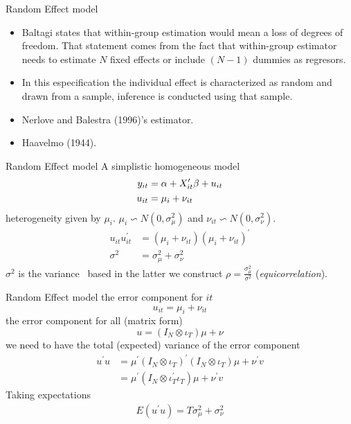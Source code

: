 \begin{frame}{Random Effect model}
	\begin{itemize}
		\item Baltagi states that within-group estimation would mean a loss of degrees of freedom. That statement comes from the fact that within-group estimator needs to estimate $N$ fixed effects or include $(N-1)$ dummies as regresors. \pause
		\item In this especification the individual effect is characterized as random and drawn from a sample, inference is conducted using that sample. \pause
		\item Nerlove and Balestra (1996)'s estimator. \pause
		\item Haavelmo (1944).
	\end{itemize}
\end{frame}
\begin{frame}{Random Effect model}
	A simplistic homogeneous model
		\begin{align}
			y_{it} & = \alpha +X_{it}^{\prime }\beta +u_{it} \\
			u_{it} & = \mu _{i}+\nu _{it}  \notag
		\end{align}
	heterogeneity given by $\mu _{i}.$ $\mu _{i}\backsim N\left( 0,\sigma _{\mu
	}^{2}\right) $ and $\nu _{it}\backsim N\left( 0,\sigma _{\nu }^{2}\right) .$
		\begin{align*}
			u_{it}u_{it}^{\prime } & = \left( \mu _{i}+\nu _{it}\right) \left( \mu
										_{i}+\nu _{it}\right) ^{\prime } \\
			\sigma ^{2} & = \sigma _{\mu }^{2}+\sigma _{\nu }^{2}
		\end{align*}%
	$\sigma ^{2}$ is the variance \ based in the latter we construct $\rho = \frac{\sigma _{\mu }^{2}}{\sigma ^{2}}$ (\emph{equicorrelation}).
\end{frame}
\begin{frame}{Random Effect model}
	the error component for $it$
		$$u_{it}=\mu _{i}+\nu _{it}$$
	the error component for all (matrix form)%
		$$u=\left( I_{N}\otimes \iota _{T}\right) \mu +\nu$$
	we need to have the total (expected) variance of the error component%
		\begin{align*}
			u^{\prime }u & = \mu ^{\prime }\left( I_{N}\otimes \iota _{T}\right) ^{\prime
							 }\left( I_{N}\otimes \iota _{T}\right) \mu +\nu ^{\prime }v \\
						 & = \mu ^{\prime }\left( I_{N}\otimes \iota _{T}^{\prime }\iota _{T}\right)
							 \mu +\nu ^{\prime }v
		\end{align*}
	Taking expectations
		\begin{gather}
			E(u^{\prime }u)=T\sigma _{\mu }^{2}+\sigma _{\nu }^{2}
		\end{gather}
\end{frame}

